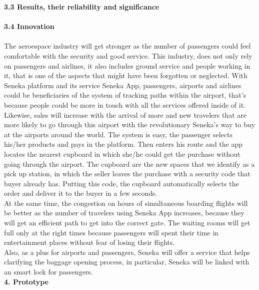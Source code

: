 \documentclass[]{article}
\begin{document}
\Large{\textbf{3.3 Results, their reliability and significance}\\}\\


\Large{\textbf{3.4 Innovation}\\}\\

The aeroespace industry will get stronger as the number of passengers could feel comfortable with the security and good service. This industry, does not only rely on passengers and airlines, it also includes ground service and people working in it, that is one of the aspects that might have been forgotten or neglected. With Seneka platform and its service Seneka App, passengers, airports and airlines could be beneficiaries of the system of tracking paths within the airport, that's because people could be more in touch with all the services offered inside of it.\\

Likewise, sales will increase with the arrival of more and new travelers that are more likely to go through this airport with the revolutionary Seneka's way to buy at the airports around the world. The system is easy, the passenger selects his/her products and pays in the platform. Then enters his route and the app locates the nearest cupboard in which she/he could get the purchase without going through the airport. The cupboard are the new spaces that we identify as a pick up station, in which the seller leaves the purchase with a security code that buyer already has. Putting this code, the cupboard automatically selects the order and deliver it to the buyer in a few seconds.\\

At the same time, the congestion on hours of simultaneous boarding flights will be better as the number of travelers using Seneka App increases, because they will get an efficient path to get into the correct gate. The waiting rooms will get full only at the right times because passengers will spent their time in entertainment places without fear of losing their flights.\\

Also, as a plus for airports and passengers, Seneka will offer a service that helps clarifying the baggage opening process, in particular, Seneka will be linked with an smart lock for passengers.\\  

\Large{\textbf{4. Prototype}\\}\\
\end{document}
